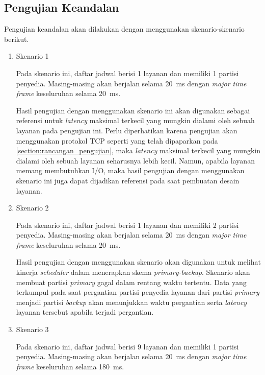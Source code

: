 \subsection{Pengujian Keandalan}

Pengujian keandalan akan dilakukan dengan menggunakan skenario-skenario berikut.

\begin{enumerate}
	\item Skenario 1

		Pada skenario ini, daftar jadwal berisi 1 layanan dan memiliki 1 partisi
		penyedia. Masing-masing akan berjalan selama \SI{20}{\milli\second} dengan
		\textit{major time frame} keseluruhan selama \SI{20}{\milli\second}.

		Hasil pengujian dengan menggunakan skenario ini akan digunakan sebagai referensi
		untuk \textit{latency} maksimal terkecil yang mungkin dialami oleh sebuah
		layanan pada pengujian ini. Perlu diperhatikan karena pengujian akan menggunakan
		protokol TCP seperti yang telah dipaparkan pada
		\autoref{section:rancangan_pengujian}, maka \textit{latency} maksimal terkecil
		yang mungkin dialami oleh sebuah layanan seharusnya lebih kecil. Namun, apabila
		layanan memang membutuhkan I/O, maka hasil pengujian dengan menggunakan skenario
		ini juga dapat dijadikan referensi pada saat pembuatan desain layanan.

	\item Skenario 2

		Pada skenario ini, daftar jadwal berisi 1 layanan dan memiliki 2 partisi
		penyedia. Masing-masing akan berjalan selama \SI{20}{\milli\second} dengan
		\textit{major time frame} keseluruhan selama \SI{20}{\milli\second}.

		Hasil pengujian dengan menggunakan skenario akan digunakan untuk melihat
		kinerja \textit{scheduler} dalam menerapkan skema \textit{primary-backup}.
		Skenario akan membuat partisi \textit{primary} gagal dalam rentang waktu
		tertentu. Data yang terkumpul pada saat pergantian partisi penyedia layanan dari
		partisi \textit{primary} menjadi partisi \textit{backup} akan menunjukkan waktu
		pergantian serta \textit{latency} layanan tersebut apabila terjadi pergantian.

	\item Skenario 3

		Pada skenario ini, daftar jadwal berisi 9 layanan dan memiliki 1 partisi
		penyedia. Masing-masing akan berjalan selama \SI{20}{\milli\second} dengan
		\textit{major time frame} keseluruhan selama \SI{180}{\milli\second}.


\end{enumerate}

